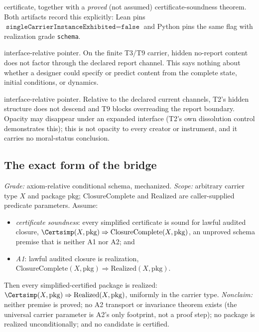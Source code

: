\begin{description}
certificate, together with a \emph{proved} (not assumed) certificate-soundness
theorem. Both artifacts record this explicitly: Lean pins
$\texttt{singleCarrierInstanceExhibited}=\texttt{false}$ and Python pins the
same flag with realization grade \texttt{schema}.
\item[T17a (report-interface pointer).] \gradeS{} interface-relative pointer.
On the finite T3/T9 carrier, hidden no-report content does not factor through
the declared report channel. This says nothing about whether a designer could
specify or predict content from the complete state, initial conditions, or
dynamics.
\item[T17b (declared-interface opacity pointer).] \gradeS{}
interface-relative pointer. Relative to the declared current channels, T2's
hidden structure does not descend and T9 blocks overreading the report
boundary. Opacity may disappear under an expanded interface (T2's own
dissolution control demonstrates this); this is not opacity to every creator
or instrument, and it carries no moral-status conclusion.
\end{description}

\subsection{The exact form of the bridge}

\begin{theorem}
\label{thm:t17o}
\gradeO{} \emph{Grade:} axiom-relative conditional schema, mechanized.
\emph{Scope:} arbitrary carrier type $X$ and package $\mathrm{pkg}$;
$\mathrm{ClosureComplete}$ and $\mathrm{Realized}$ are caller-supplied
predicate parameters. Assume:
\begin{itemize}
\item[(H1)] \emph{certificate soundness}: every simplified certificate is
sound for lawful audited closure,
$\Certsimp(X, \mathrm{pkg}) \Rightarrow \mathrm{ClosureComplete}(X,
\mathrm{pkg})$, an unproved schema premise that is neither A1 nor A2; and
\item[(H2)] \emph{A1}: lawful audited closure is realization,
$\mathrm{ClosureComplete}(X, \mathrm{pkg}) \Rightarrow
\mathrm{Realized}(X, \mathrm{pkg})$.
\end{itemize}
Then every simplified-certified package is realized:
$\Certsimp(X, \mathrm{pkg}) \Rightarrow \mathrm{Realized}(X, \mathrm{pkg})$,
uniformly in the carrier type. \emph{Nonclaim:} neither premise is proved;
no A2 transport or invariance theorem exists (the universal carrier parameter
is A2's only footprint, not a proof step); no package is realized
unconditionally; and no candidate is certified.
\end{theorem}

